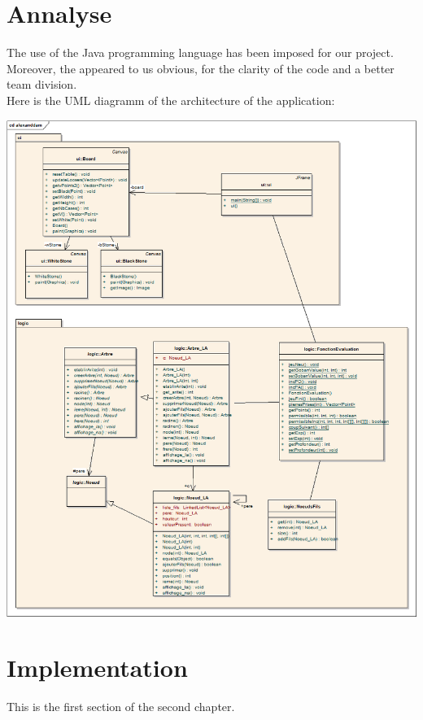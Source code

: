 \documentclass[a4paper,10pt]{report}
\newcommand{\empha}[1]{\textbf{\color{blue}{#1}}}
\begin{document}
		\section{Annalyse}
		The use of the Java programming language has been imposed for our project. Moreover, the \empha{Oriented Object Programming} appeared to us obvious, for the clarity of the code and a better team division.
\\
Here is the UML diagramm of the architecture of the application:
			\\
			\begin{center}
				\includegraphics[width=\textwidth] {img/uml.png}
			\end{center}

		\section{Implementation}
		This is the first section of the second chapter.
\end{document}

